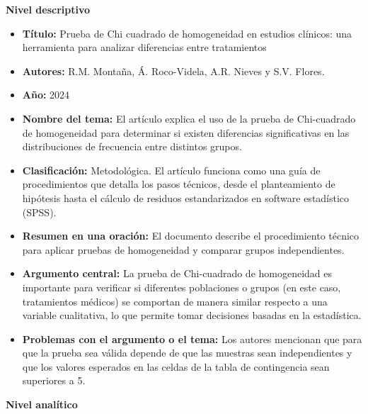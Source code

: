 \documentclass[12pt]{article}
\begin{document}
\textbf{Nivel descriptivo}
\begin{itemize}
    \item \textbf{Título:} Prueba de Chi cuadrado de homogeneidad en estudios clínicos: una 
    herramienta para analizar diferencias entre tratamientos
    
    \item \textbf{Autores:} R.M. Montaña, Á. Roco-Videla, A.R. Nieves y S.V. Flores.
    
    \item \textbf{Año:} 2024 
    
    \item \textbf{Nombre del tema:} El artículo explica el uso de la prueba de Chi-cuadrado 
    de homogeneidad para determinar si existen diferencias significativas en las distribuciones 
    de frecuencia entre distintos grupos.
    
 \item \textbf{Clasificación:} Metodológica. El artículo funciona como una guía de 
 procedimientos que detalla los pasos técnicos, desde el planteamiento de hipótesis 
 hasta el cálculo de residuos estandarizados en software estadístico (SPSS).

    
    \item \textbf{Resumen en una oración:} El documento describe el procedimiento 
    técnico para aplicar pruebas de homogeneidad y comparar grupos independientes.
    
    \item \textbf{Argumento central:} La prueba de Chi-cuadrado de homogeneidad es 
    importante para verificar si diferentes poblaciones o grupos (en este caso, 
    tratamientos médicos) se comportan de manera similar respecto a una variable 
    cualitativa, lo que permite tomar decisiones basadas en la estadística.
    
    \item \textbf{Problemas con el argumento o el tema:} Los autores mencionan que para que 
    la prueba sea válida depende de que las muestras sean independientes y que los valores 
    esperados en las celdas de la tabla de contingencia sean superiores a 5.\\
\end{itemize}

\textbf{Nivel analítico}
\end{document}
